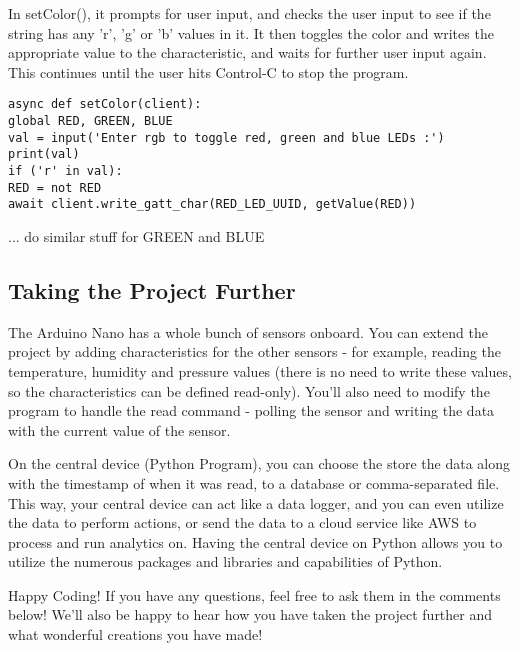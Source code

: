 In setColor(), it prompts for user input, and checks the user input to see if the string has any 'r', 'g' or 'b' values in it. It then toggles the color and writes the appropriate value to the characteristic, and waits for further user input again. This continues until the user hits Control-C to stop the program.

\begin{lstlisting}
async def setColor(client):
global RED, GREEN, BLUE
val = input('Enter rgb to toggle red, green and blue LEDs :')
print(val)
if ('r' in val):
RED = not RED
await client.write_gatt_char(RED_LED_UUID, getValue(RED))
\end{lstlisting}


... do similar stuff for GREEN and BLUE

\subsection{Taking the Project Further}

The Arduino Nano has a whole bunch of sensors onboard. You can extend the project by adding characteristics for the other sensors - for example, reading the temperature, humidity and pressure values (there is no need to write these values, so the characteristics can be defined read-only). You'll also need to modify the program to handle the read command - polling the sensor and writing the data with the current value of the sensor.

On the central device (Python Program), you can choose the store the data along with the timestamp of when it was read, to a database or comma-separated file. This way, your central device can act like a data logger, and you can even utilize the data to perform actions, or send the data to a cloud service like AWS to process and run analytics on. Having the central device on Python allows you to utilize the numerous packages and libraries and capabilities of Python.

Happy Coding! If you have any questions, feel free to ask them in the comments below! We'll also be happy to hear how you have taken the project further and what wonderful creations you have made!

